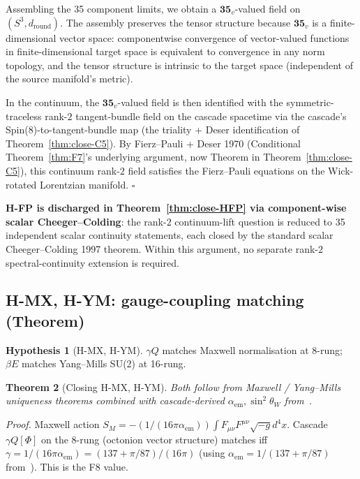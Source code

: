 \documentclass[11pt]{article}
\theoremstyle{plain}
\newtheorem{theorem}{Theorem}[section]
\theoremstyle{definition}
\newtheorem{hypothesis}[theorem]{Hypothesis}
\theoremstyle{remark}
\begin{document}
Assembling the 35 component limits, we obtain a $\mathbf{35}_v$-valued field on $(S^3, d_\text{round})$. The assembly preserves the tensor structure because $\mathbf{35}_v$ is a finite-dimensional vector space: componentwise convergence of vector-valued functions in finite-dimensional target space is equivalent to convergence in any norm topology, and the tensor structure is intrinsic to the target space (independent of the source manifold's metric).

In the continuum, the $\mathbf{35}_v$-valued field is then identified with the symmetric-traceless rank-$2$ tangent-bundle field on the cascade spacetime via the cascade's Spin(8)-to-tangent-bundle map (the triality + Deser identification of Theorem~\ref{thm:close-C5}). By Fierz--Pauli + Deser 1970 (Conditional Theorem~\ref{thm:F7}'s underlying argument, now Theorem in Theorem~\ref{thm:close-C5}), this continuum rank-$2$ field satisfies the Fierz--Pauli equations on the Wick-rotated Lorentzian manifold. \hfill$\square$

\textbf{H-FP is discharged in Theorem~\ref{thm:close-HFP} via component-wise scalar Cheeger--Colding}: the rank-$2$ continuum-lift question is reduced to 35 independent scalar continuity statements, each closed by the standard scalar Cheeger--Colding 1997 theorem. Within this argument, no separate rank-$2$ spectral-continuity extension is required.

\subsection{H-MX, H-YM: gauge-coupling matching (Theorem)}\label{sec:discharge-HMXYM}

\begin{hypothesis}[H-MX, H-YM]
$\gamma Q$ matches Maxwell normalisation at 8-rung; $\beta E$ matches Yang--Mills SU(2) at 16-rung.
\end{hypothesis}

\begin{theorem}[Closing H-MX, H-YM]\label{thm:close-HMXYM}
Both follow from Maxwell / Yang--Mills uniqueness theorems combined with cascade-derived $\alpha_\mathrm{em}, \sin^2\theta_W$ from~\citet{SmartXXII}.
\end{theorem}

\noindent\emph{Proof.}
Maxwell action $S_M = -(1/(16\pi\alpha_\mathrm{em})) \int F_{\mu\nu} F^{\mu\nu} \sqrt{-g} d^4x$. Cascade $\gamma Q[\Phi]$ on the 8-rung (octonion vector structure) matches iff $\gamma = 1/(16\pi\alpha_\mathrm{em}) = (137+\pi/87)/(16\pi)$ (using $\alpha_\mathrm{em} = 1/(137+\pi/87)$ from~\citealp{SmartXXII}). This is the F8 value.
\end{document}
